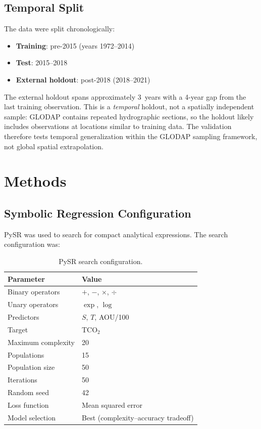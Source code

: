 \documentclass[12pt,a4paper]{article}
\begin{document}
\subsection{Temporal Split}

The data were split chronologically:
\begin{itemize}[nosep]
    \item \textbf{Training}: pre-2015 (years 1972--2014)
    \item \textbf{Test}: 2015--2018
    \item \textbf{External holdout}: post-2018 (2018--2021)
\end{itemize}
The external holdout spans approximately 3~years with a 4-year gap from the last training observation. This is a \emph{temporal} holdout, not a spatially independent sample: GLODAP contains repeated hydrographic sections, so the holdout likely includes observations at locations similar to training data. The validation therefore tests temporal generalization within the GLODAP sampling framework, not global spatial extrapolation.

\section{Methods}
\label{sec:methods}

\subsection{Symbolic Regression Configuration}
\label{sec:sr_config}

PySR \citep{Cranmer2023} was used to search for compact analytical expressions. The search configuration was:

\begin{table}[htbp]
\centering
\caption{PySR search configuration.}
\label{tab:pysr_config}
\begin{tabular}{ll}
\toprule
\textbf{Parameter} & \textbf{Value} \\
\midrule
Binary operators  & $+$, $-$, $\times$, $\div$ \\
Unary operators   & $\exp$, $\log$ \\
Predictors        & $S$, $T$, AOU/100 \\
Target            & TCO$_2$ \\
Maximum complexity & 20 \\
Populations       & 15 \\
Population size   & 50 \\
Iterations        & 50 \\
Random seed       & 42 \\
Loss function     & Mean squared error \\
Model selection   & Best (complexity--accuracy tradeoff) \\
\bottomrule
\end{tabular}
\end{table}
\end{document}
